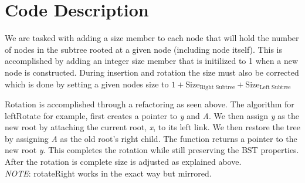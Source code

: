 \documentclass[11pt]{article}
\begin{document}
\pagebreak
\section*{Code Description}
    We are tasked with adding a size member to each node that will hold the number of nodes in the subtree rooted at a given node (including node itself). This is accomplished by adding an integer size member that is initilized to 1 when a new node is constructed. During insertion and rotation the size must also be corrected which is done by setting a given nodes size to  $1 + \text{Size}_\text{Right Subtree} + \text{Size}_\text{Left Subtree}$

\begin{center}
\hspace{2cm}

\end{center}

    Rotation is accomplished through a refactoring as seen above. The algorithm for leftRotate for example, first creates a pointer to \textit{y} and \textit{A}. We then assign \textit{y} as the new root by attaching the current root, \textit{x}, to its left link. We then restore the tree by assigning \textit{A} as the old root's right child. The function returns a pointer to the new root \textit{y}. This completes the rotation while still preserving the BST properties. After the rotation is complete size is adjusted as explained above. \\
    \textit{NOTE}: rotateRight works in the exact way but mirrored.

\pagebreak
\end{document}
